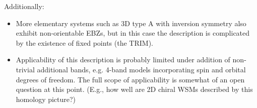 {Additionally:

\begin{itemize}
	\item More elementary systems such as 3D type A with inversion symmetry also exhibit non-orientable EBZs, but in this case the description is complicated by the existence of fixed points (the TRIM).
	
	\item Applicability of this description is probably limited under addition of non-trivial additional bands, e.g. 4-band models incorporating spin and orbital degrees of freedom. The full scope of applicability is somewhat of an open question at this point. (E.g., how well are 2D chiral WSMs described by this homology picture?)
\end{itemize}
}



